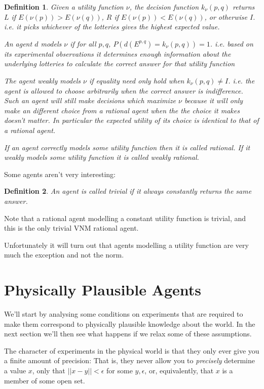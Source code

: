 \documentclass[a4paper]{book}
\newtheorem{definition}{Definition}[section]
\begin{document}
\begin{definition}
Given a utility function $\nu$, the decision function $k_\nu(p, q)$ returns
$L$ if $E(\nu(p)) > E(\nu(q))$, $R$ if $E(\nu(p)) < E(\nu(q))$, or otherwise
$I$. i.e. it picks whichever of the lotteries gives the highest expected
value.

An agent $d$ models $\nu$ if 
for all $p, q$, $P(d(E^{p, q}) = k_\nu(p, q)) = 1$. i.e. based on its
experimental observations it determines enough information about the underlying
lotteries to calculate the correct answer for that utility function

The agent weakly models $\nu$ if equality need only hold when $k_\nu(p, q) \neq I$.
i.e. the agent is allowed to choose arbitrarily when the correct answer is
indifference. Such an agent will still make decisions which maximize $\nu$ because
it will only make an different choice from a rational agent when the the
choice it makes doesn't matter. In particular the expected utility of its choice
is identical to that of a rational agent.

If an agent correctly models some utility function then it is called rational.
If it weakly models some utility function it is called weakly rational.
\end{definition}

Some agents aren't very interesting:

\begin{definition}
An agent is called trivial if it always constantly returns the same answer.
\end{definition}

Note that a rational agent modelling a constant utility function is trivial,
and this is the only trivial VNM rational agent.

Unfortunately it will turn out that agents modelling a utility function
are very much the exception and not the norm.

\section{Physically Plausible Agents}

We'll start by analysing some conditions on experiments that are required
to make them correspond to physically plausible knowledge about the world.
In the next section we'll then see what happens if we relax some of these
assumptions.

The character of experiments in the physical world is that they only ever
give you a finite amount of precision: That is, they never allow you to
\textit{precisely} determine a value $x$,
only that $||x - y|| < \epsilon$
for some $y, \epsilon$,
or, equivalently, that $x$
is a member of some open set.
\end{document}
